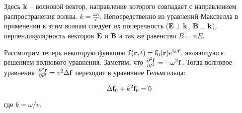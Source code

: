\noindent
Здесь $\mathbf k$ -- волновой вектор, направление которого совпадает с направлением распространения волны. $k = \frac{\omega n}{c}$.
Непосредственно из уравнений Максвелла в применении к этим волнам следует их поперечность ($\mathbf E \perp \mathbf k$, $\mathbf B \perp \mathbf k$), перпендикулярность векторов $\mathbf E$ и $\mathbf B$ а так же равенство $B = n E$.

Рассмотрим теперь некоторую функцию $\mathbf f (\mathbf r, t) = \mathbf f_0 (\mathbf r) e^{i \omega t}$, являющуюся решением волнового уравнения. Заметим, что $\frac{\partial^2 \mathbf f}{\partial t^2} = - \omega^2 \mathbf f$. Тогда волновое уравнения $\frac{\partial^2 \mathbf f}{\partial t^2} = v^2 \Delta \mathbf f$ переходит в уравнение Гельмгольца:

\begin{equation}
    \Delta \mathbf f_0 + k^2 \mathbf f_0 = 0
\end{equation}

\noindent
где $k = \omega / v$.